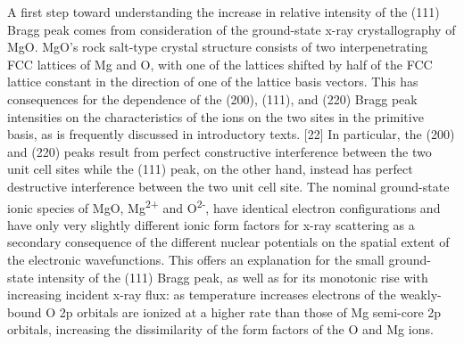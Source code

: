 A first step toward understanding the increase in relative intensity of
the (111) Bragg peak comes from consideration of the ground-state x-ray
crystallography of MgO. MgO's rock salt-type crystal structure consists
of two interpenetrating FCC lattices of Mg and O, with one of the
lattices shifted by half of the FCC lattice constant in the direction of
one of the lattice basis vectors. This has consequences for the
dependence of the (200), (111), and (220) Bragg peak intensities on the
characteristics of the ions on the two sites in the primitive basis, as
is frequently discussed in introductory texts. {[}22{]} In particular,
the (200) and (220) peaks result from perfect constructive interference
between the two unit cell sites while the (111) peak, on the other hand,
instead has perfect destructive interference between the two unit cell
site. The nominal ground-state ionic species of MgO,
Mg\textsuperscript{2+} and O\textsuperscript{2-}, have identical
electron configurations and have only very slightly different ionic form
factors for x-ray scattering as a secondary consequence of the different
nuclear potentials on the spatial extent of the electronic
wavefunctions. This offers an explanation for the small ground-state
intensity of the (111) Bragg peak, as well as for its monotonic rise
with increasing incident x-ray flux: as temperature increases electrons
of the weakly-bound O 2p orbitals are ionized at a higher rate than
those of Mg semi-core 2p orbitals, increasing the dissimilarity of the
form factors of the O and Mg ions.

